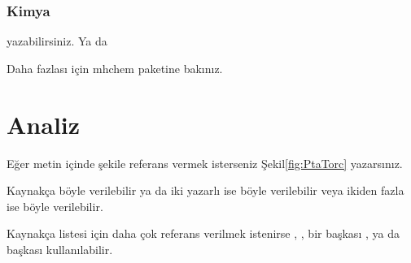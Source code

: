 \subsubsection{Kimya}
 yazabilirsiniz. Ya da


Daha fazlası için mhchem paketine bakınız.
 
\section{Analiz}
Eğer metin içinde şekile referans vermek isterseniz Şekil\ref{fig:PtaTorc} yazarsınız. 

Kaynakça böyle verilebilir \parencite{celik_microstructure_2013} ya da iki yazarlı ise böyle verilebilir \parencite{gatto_plasma_2004} veya ikiden fazla ise böyle verilebilir.
\parencite{celik_effects_2011}

Kaynakça listesi için daha çok referans verilmek istenirse \parencite{yazdi_microstructure_2015, keehan_influence_2006, guo_microstructure_2014}, \parencite{kim_variation_2013}, bir başkası \parencite{xibao_metallurgical_2005},  ya da başkası \parencite{jin_effect_1997} kullanılabilir.